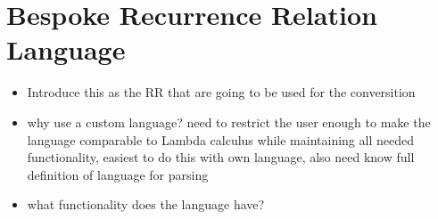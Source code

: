 \documentclass{article}
\begin{document}





\section{Bespoke Recurrence Relation Language}

\begin{itemize}
  \item Introduce this as the RR that are going to be used for the conversition
  \item why use a custom language? need to restrict the user enough to make the language comparable to Lambda calculus while maintaining all needed functionality, easiest to do this with own language, also need know full definition of language for parsing 
  \item what functionality does the language have? 
\end{itemize}
\end{document}

